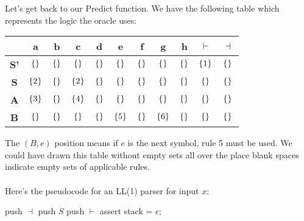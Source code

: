 \documentclass[]{article}
\DeclarePairedDelimiter{\set}{\lbrace}{\rbrace}
\theoremstyle{definition}
\begin{document}
				Let's get back to our Predict function. We have the following table which represents the logic the oracle uses:
				\begin{center}
					\begin{tabular}{|c|c|c|c|c|c|c|c|c|c|c|}
						\hline
						& \textbf{a} & \textbf{b} & \textbf{c} & \textbf{d} & \textbf{e} & \textbf{f} & \textbf{g} & \textbf{h} & $\boldsymbol \vdash$ & $\boldsymbol \dashv$ \\ \hline
						\textbf{S'} & $\set{}$ & $\set{}$ & $\set{}$ & $\set{}$ & $\set{}$ & $\set{}$ & $\set{}$ & $\set{}$ & $\set{1}$ & $\set{}$ \\
						\textbf{S} & $\set{2}$ & $\set{}$ & $\set{2}$ & $\set{}$ & $\set{}$ & $\set{}$ & $\set{}$ & $\set{}$ & $\set{}$ & $\set{}$ \\
						\textbf{A} & $\set{3}$ & $\set{}$ & $\set{4}$ & $\set{}$ & $\set{}$ & $\set{}$ & $\set{}$ & $\set{}$ & $\set{}$ & $\set{}$ \\
						\textbf{B} & $\set{}$ & $\set{}$ & $\set{}$ & $\set{}$ & $\set{5}$ & $\set{}$ & $\set{6}$ & $\set{}$ & $\set{}$ & $\set{}$ \\ \hline
					\end{tabular}
				\end{center}
				
				The $(B, e)$ position means if $e$ is the next symbol, rule 5 must be used. We could have drawn this table without empty sets all over the place \textendash{} blank spaces indicate empty sets of applicable rules.
				\\ \\
				Here's the pseudocode for an LL(1) parser for input $x$: \\
				\begin{algorithm}[H]
					push $\dashv$\;
					push $S$\;
					push $\vdash$\;
					assert stack = $\epsilon$;
				\end{algorithm}
\end{document}
